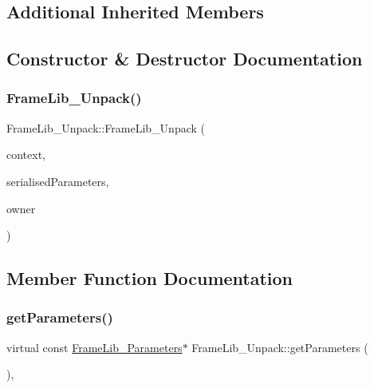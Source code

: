 \subsection*{Additional Inherited Members}


\subsection{Constructor \& Destructor Documentation}
\mbox{\label{class_frame_lib___unpack_a987b9186fb9ec69664610f3893063dcc}} 
\subsubsection{\texorpdfstring{Frame\+Lib\+\_\+\+Unpack()}{FrameLib\_Unpack()}}
{\footnotesize\ttfamily Frame\+Lib\+\_\+\+Unpack\+::\+Frame\+Lib\+\_\+\+Unpack (\begin{DoxyParamCaption}\item[{\hyperlink{class_frame_lib___context}{Frame\+Lib\+\_\+\+Context}}]{context,  }\item[{\hyperlink{class_frame_lib___parameters_1_1_serial}{Frame\+Lib\+\_\+\+Parameters\+::\+Serial} $\ast$}]{serialised\+Parameters,  }\item[{void $\ast$}]{owner }\end{DoxyParamCaption})}



\subsection{Member Function Documentation}
\mbox{\label{class_frame_lib___unpack_aa9da91c13a8e4d648bdef0037973dc56}} 
\subsubsection{\texorpdfstring{get\+Parameters()}{getParameters()}}
{\footnotesize\ttfamily virtual const \hyperlink{class_frame_lib___parameters}{Frame\+Lib\+\_\+\+Parameters}$\ast$ Frame\+Lib\+\_\+\+Unpack\+::get\+Parameters (\begin{DoxyParamCaption}{ }\end{DoxyParamCaption})\hspace{0.3cm}{\ttfamily [inline]}, {\ttfamily [virtual]}}



